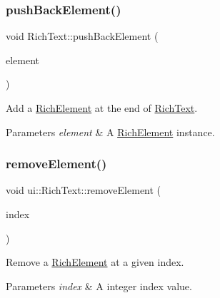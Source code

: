 \subsubsection{\texorpdfstring{push\+Back\+Element()}{pushBackElement()}\hspace{0.1cm}{\footnotesize\ttfamily [2/2]}}
{\footnotesize\ttfamily void Rich\+Text\+::push\+Back\+Element (\begin{DoxyParamCaption}\item[{\hyperlink{classui_1_1RichElement}{Rich\+Element} $\ast$}]{element }\end{DoxyParamCaption})}



Add a \hyperlink{classui_1_1RichElement}{Rich\+Element} at the end of \hyperlink{classui_1_1RichText}{Rich\+Text}. 


\begin{DoxyParams}{Parameters}
{\em element} & A \hyperlink{classui_1_1RichElement}{Rich\+Element} instance. \\
\hline
\end{DoxyParams}
\mbox{\label{classui_1_1RichText_a1bb5065db5ec47543bc3cf80eb5cda44}} 
\subsubsection{\texorpdfstring{remove\+Element()}{removeElement()}\hspace{0.1cm}{\footnotesize\ttfamily [1/4]}}
{\footnotesize\ttfamily void ui\+::\+Rich\+Text\+::remove\+Element (\begin{DoxyParamCaption}\item[{int}]{index }\end{DoxyParamCaption})}



Remove a \hyperlink{classui_1_1RichElement}{Rich\+Element} at a given index. 


\begin{DoxyParams}{Parameters}
{\em index} & A integer index value. \\
\hline
\end{DoxyParams}
\mbox{\label{classui_1_1RichText_a5db2f690c2dadc6ac6f5f0ef3f4ba55c}} 
